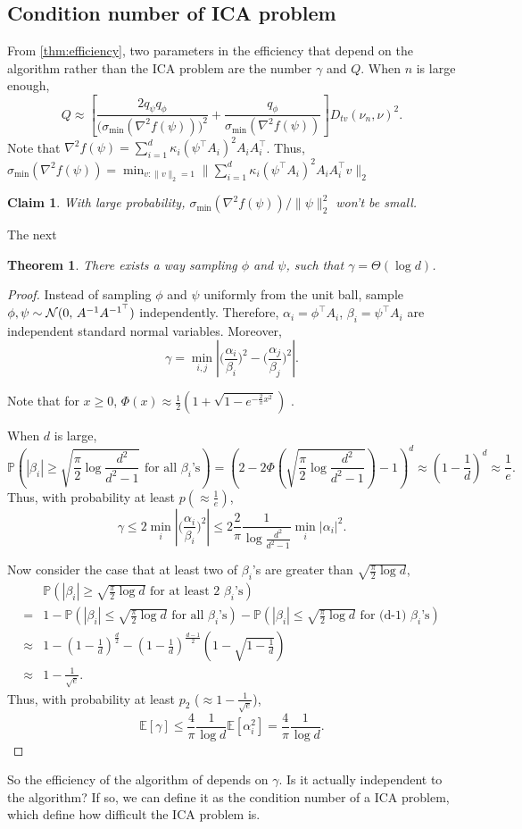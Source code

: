 \documentclass[english]{article} %
\newcommand{\cN}{\cal{N}}
\newcommand{\E}{\mathbb{E}}
\newcommand{\Prob}[1]{\mathbb{P}\left(#1\right)}
\newtheorem{thm}[lemma]{Theorem}
\newtheorem{claim}[lemma]{Claim}
\theoremstyle{definition}
\begin{document}
\subsection{Condition number of ICA problem}
From \cref{thm:efficiency}, two parameters in the efficiency that depend on the algorithm rather than the ICA problem are the number $\gamma$ and $Q$. 
When $n$ is large enough, 
\[
Q\approx \left[ \frac{2q_{\psi}q_{\phi}}{\big(\sigma_{\min}(\nabla^2f(\psi))\big)^2}+\frac{q_{\phi}}{\sigma_{\min}(\nabla^2f(\psi))}\right]D_{tv}(\nu_n , \nu)^2.
\] 
Note that $\nabla^2f(\psi) = \sum_{i=1}^{d} \kappa_i(\psi^{\top}A_i)^2A_iA_i^{\top}$. Thus, $\sigma_{\min}(\nabla^2f(\psi)) = \min_{v:\|v\|_2=1}\|\sum_{i=1}^{d} \kappa_i(\psi^{\top}A_i)^2A_iA_i^{\top}v\|_2$ 

\begin{claim}
With large probability, $\sigma_{\min}(\nabla^2f(\psi))/\|\psi\|_2^2$ won't be small.
\end{claim}

The next
\begin{thm}
There exists a way sampling $\phi$ and $\psi$, such that $\gamma = \Theta(\log d)$.
\end{thm}
\begin{proof}
Instead of sampling $\phi$ and $\psi$ uniformly from the unit ball, sample $\phi,\psi \sim {\cN} (0,\,A^{-1}A^{{-1}^{\top}})$ independently. Therefore, $\alpha_i = \phi^{\top}A_i$, $\beta_i = \psi^{\top}A_i$ are independent standard normal variables. Moreover, 
\[
\gamma  = \min_{i,j} \left\vert \big(\frac{\alpha_i}{\beta_i}\big)^2 - \big(\frac{\alpha_j}{\beta_j}\big)^2 \right\vert.
\] 

Note that for $x\ge0$, $\Phi(x) \approx \frac12 (1+\sqrt{1-e^{-\frac{2}{\pi}x^2}})$ \citep{aludaat2008note}.
 
 When $d$ is large,
\[
\Prob{|\beta_i| \ge \sqrt{\frac{\pi}{2}\log \frac{d^2}{d^2-1}} \text{ for all } \beta_i\text{'s}} = (2- 2\Phi(\sqrt{\frac{\pi}{2}\log \frac{d^2}{d^2-1}})-1)^d \approx \left(1-\frac{1}{d}\right)^d \approx \frac{1}{e}.
\]
Thus, with probability at least $p (\approx \frac{1}{e})$,
\[
\gamma \le 2 \min_i \left\vert \big(\frac{\alpha_i}{\beta_i}\big)^2\right\vert \le 2 \frac{2}{\pi}\frac{1}{\log \frac{d^2}{d^2-1}}\min_i |\alpha_i|^2.
\]

Now consider the case that at least two of $\beta_i$'s are greater than $\sqrt{\frac{\pi}{2}\log d}$,
\begin{align*}
& \Prob{|\beta_i| \ge \sqrt{\frac{\pi}{2}\log d} \text{ for at least 2 } \beta_i\text{'s}} \\
=  & 1 - \Prob{|\beta_i| \le \sqrt{\frac{\pi}{2}\log d} \text{ for all } \beta_i\text{'s}} - \Prob{|\beta_i| \le \sqrt{\frac{\pi}{2}\log d} \text{ for (d-1) } \beta_i\text{'s}} \\
\approx & 1 - (1-\frac{1}{d})^{\frac{d}{2}} -  (1-\frac{1}{d})^{\frac{d-1}{2}}(1-\sqrt{1-\frac{1}{d}}) \\
\approx & 1 -\frac{1}{\sqrt{e}}.
\end{align*}
Thus, with probability at least $p_2$ ($\approx 1-\frac{1}{\sqrt{e}}$),
\[
\E[\gamma] \le \frac{4}{\pi} \frac{1}{\log d} \E[\alpha_i^2] = \frac{4}{\pi} \frac{1}{\log d}.
\]
\end{proof}

So the efficiency of the algorithm of \citet{DHsu2012} depends on $\gamma$. Is it actually independent to the algorithm? If so, we can define it as the condition number of a ICA problem, which define how difficult the ICA problem is. 



\end{document}
